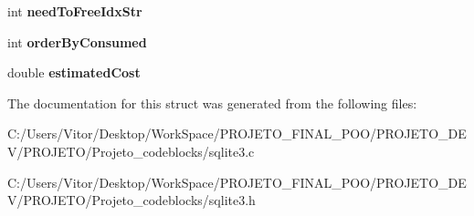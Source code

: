 \begin{DoxyCompactItemize}
\item 
\hypertarget{structsqlite3__index__info_a5410066c067c3891cdf165c70cc4d6b1}{int {\bfseries need\-To\-Free\-Idx\-Str}}\label{structsqlite3__index__info_a5410066c067c3891cdf165c70cc4d6b1}

\item 
\hypertarget{structsqlite3__index__info_a5515d9de0f37f68d7e0930c20a668b29}{int {\bfseries order\-By\-Consumed}}\label{structsqlite3__index__info_a5515d9de0f37f68d7e0930c20a668b29}

\item 
\hypertarget{structsqlite3__index__info_aa8b4fe1d2ee38aab57ba5e1da00d7830}{double {\bfseries estimated\-Cost}}\label{structsqlite3__index__info_aa8b4fe1d2ee38aab57ba5e1da00d7830}

\end{DoxyCompactItemize}


The documentation for this struct was generated from the following files\-:\begin{DoxyCompactItemize}
\item 
C\-:/\-Users/\-Vitor/\-Desktop/\-Work\-Space/\-P\-R\-O\-J\-E\-T\-O\-\_\-\-F\-I\-N\-A\-L\-\_\-\-P\-O\-O/\-P\-R\-O\-J\-E\-T\-O\-\_\-\-D\-E\-V/\-P\-R\-O\-J\-E\-T\-O/\-Projeto\-\_\-codeblocks/sqlite3.\-c\item 
C\-:/\-Users/\-Vitor/\-Desktop/\-Work\-Space/\-P\-R\-O\-J\-E\-T\-O\-\_\-\-F\-I\-N\-A\-L\-\_\-\-P\-O\-O/\-P\-R\-O\-J\-E\-T\-O\-\_\-\-D\-E\-V/\-P\-R\-O\-J\-E\-T\-O/\-Projeto\-\_\-codeblocks/sqlite3.\-h\end{DoxyCompactItemize}
